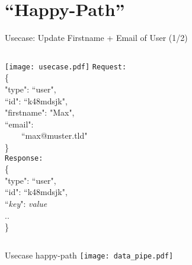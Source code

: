 \documentclass[compress]{beamer}
\begin{document}
\section{"`Happy-Path"'}
\begin{frame}{Usecase: Update Firstname + Email of User (1/2)}
  \begin{columns}[c]
    \texttt{[image: usecase.pdf]}
    {\tt Request:}
    \\
    \{\\
      "type": ``user",\\
      ``id": ``k48mdsjk",\\
      "firstname": "Max",\\
      ``email": \\~~~~``max@muster.tld"\\
    \}
    \\
    {\tt Response:}
    \\
    \{\\
      "type": ``user",\\
      ``id": ``k48mdsjk",\\
      ``\textit{key}": \textit{value}\\
      ..\\
    \}
  \end{columns}
\end{frame}
\begin{frame}{Usecase happy-path}
  \texttt{[image: data\_pipe.pdf]}
\end{frame}
\end{document}
